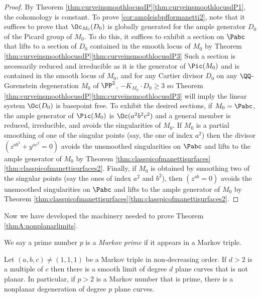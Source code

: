 \begin{proof}

By Theorem \ref{thm:curveinsmoothlocusdP}\eqref{thm:curveinsmoothlocusdP1}, the cohomology is constant. To prove \eqref{cor:ampleisbpfformanetti2}, note that it suffices to prove that $\Oc_{M_0}(D_0)$ is globally generated for the ample generator $D_0$ of the Picard group of $M_0$. To do this, it suffices to exhibit a section on $\Pabc$ that lifts to a section of $D_0$ contained in the smooth locus of $M_0$ by Theorem \ref{thm:curveinsmoothlocusdP}\eqref{thm:curveinsmoothlocusdP3} Such a section is necessarily reduced and irreducible as it is the generator of $\Pic(M_0)$ and is contained in the smooth locus of $M_0$, and for any Cartier divisor $D_0$ on any $\QQ$-Gorenstein degeneration $M_0$ of $\PP^2$, $-K_{M_0} \cdot D_0 \ge 3$ so Theorem \ref{thm:curveinsmoothlocusdP}\eqref{thm:curveinsmoothlocusdP3} will imply the linear system $\Oc(D_0)$ is basepoint free. To exhibit the desired sections, if $M_0 = \Pabc$, the ample generator of $\Pic(M_0)$ is $\Oc(a^2b^2c^2)$ and a general member is reduced, irreducible, and avoids the singularities of $M_0$. If $M_0$ is a partial smoothing of one of the singular points (say, the one of index $a^2$) then the divisor \hbox{$(z^{ab^2}+y^{ac^2}=0)$} avoids the unsmoothed singularities on $\Pabc$ and lifts to the ample generator of $M_0$ by Theorem \ref{thm:classpicofmanettisurfaces}\eqref{thm:classpicofmanettisurfaces2}. Finally, if $M_0$ is obtained by smoothing two of the singular points (say the ones of index $a^2$ and $b^2$), then $(z^{ab}=0)$ avoids the unsmoothed singularities on $\Pabc$ and lifts to the ample generator of $M_0$ by Theorem \ref{thm:classpicofmanettisurfaces}\eqref{thm:classpicofmanettisurfaces2}.
\end{proof}

Now we have developed the machinery needed to prove Theorem \ref{thmA:nonplanarlimits}.

\begin{definition}
We say a prime number $p$ is a \textit{Markov prime} if it appears in a Markov triple.
\end{definition}

\begin{theorem}\label{smoothlimits1}
Let $(a,b,c)\ne (1,1,1)$ be a Markov triple in non-decreasing order. If $d>2$ is a multiple of $c$ then there is a smooth limit of degree $d$ plane curves that is not planar. In particular, if $p>2$ is a Markov number that is prime, there is a nonplanar degeneration of degree $p$ plane curves.
\end{theorem}


